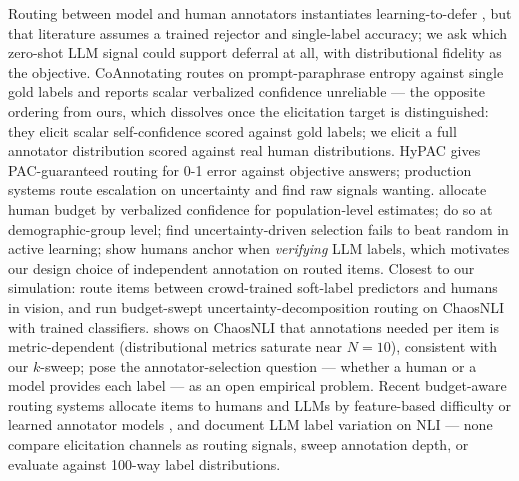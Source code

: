 \documentclass[11pt]{article}
\begin{document}
Routing between model and human annotators instantiates learning-to-defer \citep{madras2018predict,mozannar2020consistent,desalvo2025budgeted}, but that literature assumes a trained rejector and single-label accuracy; we ask which zero-shot LLM signal could support deferral at all, with distributional fidelity as the objective. CoAnnotating \citep{li2023coannotating} routes on prompt-paraphrase entropy against single gold labels and reports scalar verbalized confidence unreliable --- the opposite ordering from ours, which dissolves once the elicitation target is distinguished: they elicit scalar self-confidence scored against gold labels; we elicit a full annotator distribution scored against real human distributions. HyPAC \citep{zeng2026hypac} gives PAC-guaranteed routing for 0-1 error against objective answers; production systems \citep{kim2024meganno,bachar2026escalation} route escalation on uncertainty and find raw signals wanting. \citet{gligoric2025can} allocate human budget by verbalized confidence for population-level estimates; \citet{mehrotra2026multi} do so at demographic-group level; \citet{hakimi2026humans} find uncertainty-driven selection fails to beat random in active learning; \citet{schroeder2025anchoring} show humans anchor when \emph{verifying} LLM labels, which motivates our design choice of independent annotation on routed items. Closest to our simulation: \citet{klugmann2024noneed} route items between crowd-trained soft-label predictors and humans in vision, and \citet{peale2026flexible} run budget-swept uncertainty-decomposition routing on ChaosNLI with trained classifiers. \citet{kohli2026metric} shows on ChaosNLI that annotations needed per item is metric-dependent (distributional metrics saturate near $N = 10$), consistent with our $k$-sweep; \citet{gruber2025revisiting} pose the annotator-selection question --- whether a human or a model provides each label --- as an open empirical problem. Recent budget-aware routing systems allocate items to humans and LLMs by feature-based difficulty \citep{purificato2026quorum} or learned annotator models \citep{moriyama2026task}, and \citet{kulmizev2026label} document LLM label variation on NLI --- none compare elicitation channels as routing signals, sweep annotation depth, or evaluate against 100-way label distributions.
\end{document}
